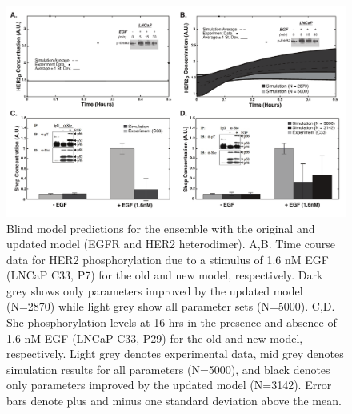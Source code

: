 \documentclass[12pt]{article}
\begin{document}
\begin{figure}\centering
\includegraphics[width=1.0\textwidth]{./figs/Supp_Figure_NewModelvsOldModel}
\caption{Blind model predictions for the ensemble with the original and updated model (EGFR and HER2 heterodimer). A,B. Time course data for HER2 phosphorylation due to a stimulus of 1.6 nM EGF (LNCaP C33, P7) for the old and new model, respectively. Dark grey shows only parameters improved by the updated model (N=2870) while light grey show all parameter sets (N=5000). C,D. Shc phosphorylation levels at 16 hrs in the presence and absence of 1.6 nM EGF (LNCaP C33, P29) for the old and new model, respectively. Light grey denotes experimental data, mid grey denotes simulation results for all parameters (N=5000), and black denotes only parameters improved by the updated model (N=3142). Error bars denote plus and minus one standard deviation above the mean.}
\label{fg:Exps_NewModelvsOldModel}
\end{figure}

\clearpage
\end{document}
